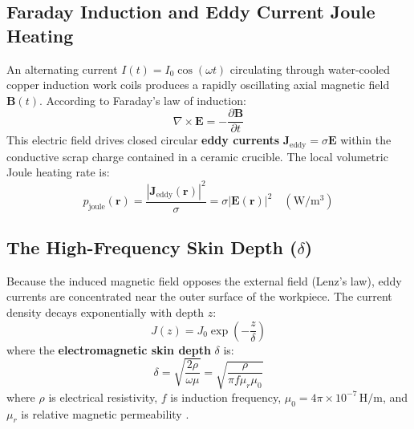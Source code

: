 \subsection{Faraday Induction and Eddy Current Joule Heating}
An alternating current $I(t) = I_0 \cos(\omega t)$ circulating through water-cooled copper induction work coils produces a rapidly oscillating axial magnetic field $\mathbf{B}(t)$. According to Faraday's law of induction:
\begin{equation}
\nabla \times \mathbf{E} = -\frac{\partial \mathbf{B}}{\partial t}
\label{eq:faraday_induction_melt}
\end{equation}
This electric field drives closed circular \textbf{eddy currents} $\mathbf{J}_{\mathrm{eddy}} = \sigma \mathbf{E}$ within the conductive scrap charge contained in a ceramic crucible. The local volumetric Joule heating rate is:
\begin{equation}
p_{\mathrm{joule}}(\mathbf{r}) = \frac{|\mathbf{J}_{\mathrm{eddy}}(\mathbf{r})|^2}{\sigma} = \sigma |\mathbf{E}(\mathbf{r})|^2 \quad (\mathrm{W/m^3})
\label{eq:joule_heating_density}
\end{equation}

\subsection{The High-Frequency Skin Depth \texorpdfstring{($\delta$)}{(delta)}}
Because the induced magnetic field opposes the external field (Lenz's law), eddy currents are concentrated near the outer surface of the workpiece. The current density decays exponentially with depth $z$:
\begin{equation}
J(z) = J_0 \exp\left(-\frac{z}{\delta}\right)
\label{eq:skin_depth_decay}
\end{equation}
where the \textbf{electromagnetic skin depth} $\delta$ is:
\begin{equation}
\delta = \sqrt{ \frac{2 \rho}{\omega \mu} } = \sqrt{ \frac{\rho}{\pi f \mu_r \mu_0} }
\label{eq:skin_depth_formula}
\end{equation}
where $\rho$ is electrical resistivity, $f$ is induction frequency, $\mu_0 = 4\pi \times 10^{-7}\,\mathrm{H/m}$, and $\mu_r$ is relative magnetic permeability \cite{davies1990induction}.

